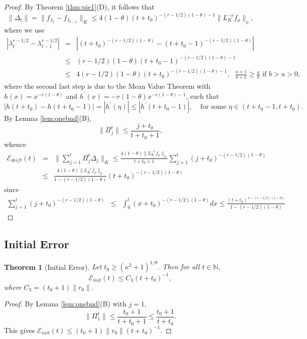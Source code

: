 \documentclass[twoside,11pt]{amsart}
\theoremstyle{theorem}
\newtheorem{thm}{Theorem}[section]
\theoremstyle{definition}
\theoremstyle{remark}
\newcommand{\DS}{\displaystyle}
\def\Err{{\mathscr E}}
\def\N{{\mathbb N}}
\def\t{t_0}
\def\ka{\kappa}
\begin{document}
\begin{proof} By Theorem \ref{thm:pie1}(D), it follows that
\[ \|\Delta_t\| = \|f_{\lambda_t}-f_{\lambda_{t-1}}\|_K \leq 4(1-\theta) (t+\t)^{-(r-1/2)(1-\theta)-1} \|L_K^{-r} f_\rho\|_\rho, \]
where we use
\begin{eqnarray}
|\lambda_{t}^{r-1/2} - \lambda_{t-1}^{r-1/2} | & = & | (t+\t)^{-(r-1/2)(1-\theta)} - (t+\t-1)^{-(r-1/2)(1-\theta)}| \nonumber \\
& \leq & (r-1/2)(1-\theta) (t+\t-1)^{-(r-1/2)(1-\theta)-1} \nonumber \\
& \leq & 4 (r-1/2)(1-\theta) (t+\t)^{-(r-1/2)(1-\theta)-1}, \ \ \ \mbox{$\DS \frac{a+1}{b+1}\geq \frac{a}{b}$ if $b>a>0$}, \label{eq:meanvaluethm}
\end{eqnarray}
where the second last step is due to the Mean Value Theorem with $h(x)=x^{-r(1-\theta)}$ and $h^\prime(x) = -r(1-\theta) x^{-r(1-\theta)-1}$, such that
\[ |h(t+\t)-h(t+\t-1)|=|h^\prime(\eta)|\leq |h^\prime(t+\t-1)|, \ \ \ \ \ \mbox{for some $\eta\in(t+\t-1,t+\t)$}. \]
By Lemma \ref{lem:onebnd}(B),
\[ \|\Pi_{j}^t\|\leq \frac{j+\t}{t+\t+1}, \]
whence
\begin{eqnarray*}
\Err_{drift}(t) &=& \| \sum_{j=1}^t \Pi_j^t \Delta_j\|_K \leq \frac{4(1-\theta)\|L_K^{-r} f_\rho\|_\rho}{t+\t+1}\sum_{j=1}^t 
(j+\t)^{-(r-1/2)(1-\theta)} \\
&\leq & \frac{4(1-\theta)\|L_K^{-r} f_\rho\|_\rho}{1-(r-1/2)(1-\theta)} (t+\t)^{-(r-1/2)(1-\theta)}
\end{eqnarray*}
since
\begin{eqnarray*}
\sum_{j=1}^t (j+\t)^{-(r-1/2)(1-\theta)} & \leq &   \int_0^t (x+\t)^{-(r-1/2)(1-\theta)} dx \leq \frac{(t+\t)^{1-(r-1/2)(1-\theta)}}{1-(r-1/2)(1-\theta)} 
\end{eqnarray*}
\end{proof}

 
\subsection{Initial Error}
\begin{thm}[Initial Error] \label{err:init} Let $\t\geq (\ka^2+1)^{1/\theta}$. Then for all $t\in \N$,
\[ \Err_{init}(t) \leq C_3 (t+\t)^{-1}, \]
where $C_3 = (\t+1)\|r_0\|$.
\end{thm}

\begin{proof}
By Lemma \ref{lem:onebnd}(B) with $j=1$,
\[ \|\Pi_1^t \| \leq \frac{\t+1}{t+\t+1} \leq \frac{\t+1}{t+\t}. \]
This gives $\Err_{init}(t) \leq (\t+1)\|r_0\| (t+\t)^{-1}$. 
\end{proof}
\end{document}
